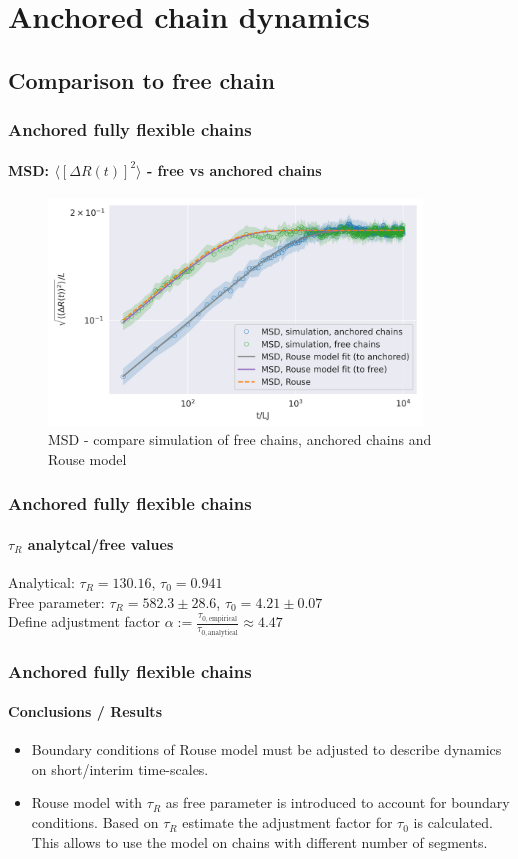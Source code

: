 \documentclass[handout]{beamer}
\newcommand{\mean}[1]{\langle #1 \rangle}
\begin{document}
\section{Anchored chain dynamics}

\subsection{Comparison to free chain}

\begin{frame}
    \frametitle{Anchored fully flexible chains}
    \framesubtitle{MSD: $\mean{[\Delta R(t)]^2}$ - free vs anchored chains}

    \begin{figure}[h]
        \includegraphics[trim={0.1cm 0.1cm 0.1cm 1cm},clip,height=6cm]{./3-exp-free-param-log.png}
        \caption{MSD - compare simulation of free chains, anchored chains and Rouse model}
        \label{fig:full-flex-chain-free-log}
    \end{figure}
\end{frame}

\begin{frame}
    \frametitle{Anchored fully flexible chains}
    \framesubtitle{$\tau_R$ analytcal/free values}

    Analytical: $\tau_R=130.16$, $\tau_0=0.941$
    \\
    Free parameter: $\tau_R=582.3 \pm 28.6$, $\tau_0=4.21 \pm 0.07$
    \\
    \vspace{1cm}
    Define adjustment factor
    $ \alpha := \frac{\tau_{0, \textrm{empirical}}}{\tau_{0, \textrm{analytical}}} \approx 4.47$
\end{frame}

\begin{frame}
    \frametitle{Anchored fully flexible chains}
    \framesubtitle{Conclusions / Results}
    \begin{itemize}
        \item Boundary conditions of Rouse model must be adjusted to describe dynamics on 
        short/interim time-scales.
        \item Rouse model with $\tau_R$ as free parameter is introduced to account for boundary
        conditions. Based on $\tau_R$ estimate the adjustment factor for $\tau_0$ is calculated.
        This allows to use the model on chains with different number of segments.

    \end{itemize}
\end{frame}
\end{document}
